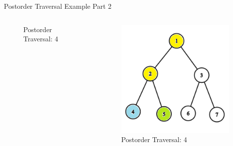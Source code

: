 \documentclass[aspectratio=169]{beamer}%
\begin{document}
\begin{frame}{Postorder Traversal Example Part 2}
\begin{columns}
\begin{column}{0.32\textwidth}
\begin{figure}
                \caption{Postorder Traversal: 4}
            \end{figure}
        \end{column}
        \hfill
        \begin{column}{0.32\textwidth}
            \begin{figure}
                \centering
                \includegraphics[width = .9\linewidth]{tree-post 6.png}
                \caption{Postorder Traversal: 4}
            \end{figure}
        \end{column}
    \end{columns}
\end{frame}
\end{document}
